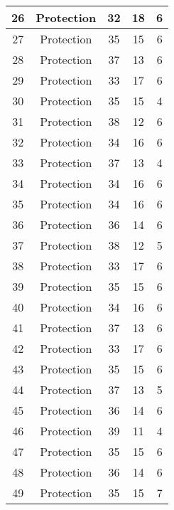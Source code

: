 \documentclass[results.tex]{subfiles}
\begin{document}
\begin{center}
\begin{tabular}{| c || c | c | c | c |}
    \hline
    26 & Protection & 32 & 18 & 6 \\ 
    \hline
    27 & Protection & 35 & 15 & 6 \\ 
    \hline
    28 & Protection & 37 & 13 & 6 \\ 
    \hline
    29 & Protection & 33 & 17 & 6 \\ 
    \hline
    30 & Protection & 35 & 15 & 4 \\ 
    \hline
    31 & Protection & 38 & 12 & 6 \\ 
    \hline
    32 & Protection & 34 & 16 & 6 \\ 
    \hline
    33 & Protection & 37 & 13 & 4 \\ 
    \hline
    34 & Protection & 34 & 16 & 6 \\ 
    \hline
    35 & Protection & 34 & 16 & 6 \\ 
    \hline
    36 & Protection & 36 & 14 & 6 \\ 
    \hline
    37 & Protection & 38 & 12 & 5 \\ 
    \hline
    38 & Protection & 33 & 17 & 6 \\ 
    \hline
    39 & Protection & 35 & 15 & 6 \\ 
    \hline
    40 & Protection & 34 & 16 & 6 \\ 
    \hline
    41 & Protection & 37 & 13 & 6 \\ 
    \hline
    42 & Protection & 33 & 17 & 6 \\ 
    \hline
    43 & Protection & 35 & 15 & 6 \\ 
    \hline
    44 & Protection & 37 & 13 & 5 \\ 
    \hline
    45 & Protection & 36 & 14 & 6 \\ 
    \hline
    46 & Protection & 39 & 11 & 4 \\ 
    \hline
    47 & Protection & 35 & 15 & 6 \\ 
    \hline
    48 & Protection & 36 & 14 & 6 \\ 
    \hline
    49 & Protection & 35 & 15 & 7 \\ 
    \hline   \end{tabular}
\end{center}
\end{document}
